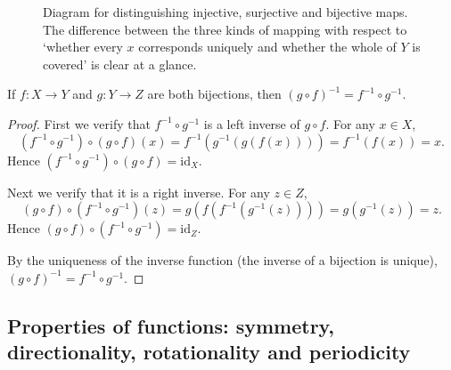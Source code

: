 \begin{figure}[htbp]
\begin{fittikz}
\end{fittikz}
\caption{Diagram for distinguishing injective, surjective and bijective maps. The difference between the three kinds of mapping with respect to `whether every $x$ corresponds uniquely and whether the whole of $Y$ is covered' is clear at a glance.}
\label{fig:injective_surjective_bijective}
\end{figure}

\begin{proposition}\label{prop:inverse_composition_order}
If $f: X \to Y$ and $g: Y \to Z$ are both bijections, then $(g \circ f)^{-1} = f^{-1} \circ g^{-1}$.
\end{proposition}

\begin{proof}
First we verify that $f^{-1} \circ g^{-1}$ is a left inverse of $g \circ f$. For any $x \in X$,
\[
(f^{-1} \circ g^{-1}) \circ (g \circ f)(x) = f^{-1}(g^{-1}(g(f(x)))) = f^{-1}(f(x)) = x.
\]
Hence $(f^{-1} \circ g^{-1}) \circ (g \circ f) = \text{id}_X$.

Next we verify that it is a right inverse. For any $z \in Z$,
\[
(g \circ f) \circ (f^{-1} \circ g^{-1})(z) = g(f(f^{-1}(g^{-1}(z)))) = g(g^{-1}(z)) = z.
\]
Hence $(g \circ f) \circ (f^{-1} \circ g^{-1}) = \text{id}_Z$.

By the uniqueness of the inverse function (the inverse of a bijection is unique), $(g \circ f)^{-1} = f^{-1} \circ g^{-1}$.
\end{proof}

\subsection{\texorpdfstring{Properties of functions: symmetry, directionality, rotationality and periodicity}{Properties of functions}}

